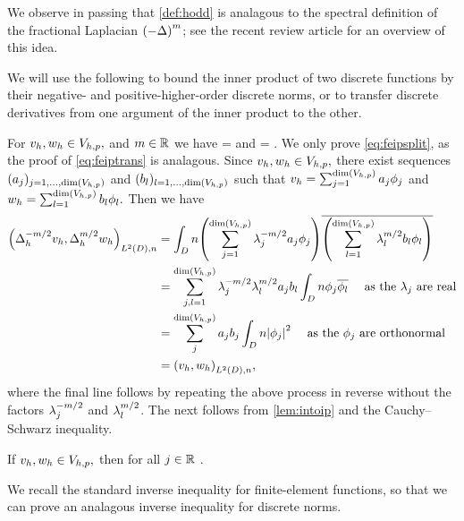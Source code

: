 We observe in passing that \cref{def:hodd} is analagous to the spectral definition of the fractional Laplacian $\mleft(-\Delta\mright)^m$; see the recent review article \cite[Section 2.5.1]{LiPaGuSoGlZhMaCaMeAiKa:18} for an overview of this idea.
\ere

We will use the following  to bound the inner product of two discrete functions by their negative- and positive-higher-order discrete norms, or to transfer discrete derivatives from one argument of the inner product to the other.

\label{lem:intoip}
For $v_{h}, w_{h} \in V_{h,p},$ and $m \in \mathbb R$ we have
\beq\label{eq:feipsplit}
\IPLtDn{\vh}{\wh} = \IPLtDn{\Deltahmmt \vh}{\Deltahmt \wh} 
\eeq
and
\beq\label{eq:feiptrans}
 = \IPLtDn{\Deltahmt \vh}{\Deltahmt \vh}.
\eeq
\ele
{}
We only prove \cref{eq:feipsplit}, as the proof of \cref{eq:feiptrans} is analagous. Since $v_{h},w_{h} \in V_{h,p},$ there exist sequences $(\aj)_{j =1,\ldots,\dimVhp}$ and $(\bsl)_{l =1,\ldots,\dimVhp}$ such that $\vh = \sum_{j=1}^{\dimVhp} \aj\phij$ and $\wh = \sum_{l=1}^{\dimVhp} \bsl \phil.$ Then we have
\begin{align*}
\IPLtDn{\Deltahmmt \vh}{\Deltahmt \wh} &= \int_D n\mleft(\sum_{j=1}^{\dimVhp}\lambdaj^{-m/2} \aj\phij\mright)\overline{\mleft(\sum_{l=1}^{\dimVhp} \lambdal^{m/2}\bsl \phil\mright)}\\
&= \sum_{j,l=1}^{\dimVhp} \lambdaj^{-m/2} \lambdal^{m/2} \aj \bsl \int_D n \phij \philbar\quad \text{ as the } \lambdaj \text{ are real}\\
& =\sum_{j}^{\dimVhp} \aj \bsj \int_D n\abs{\phij}^2\quad \text{ as the } \phij \text{ are orthonormal}\\
&= \IPLtDn{\vh}{\wh},
\end{align*}
where the final line follows by repeating the above process in reverse without the factors $\lambda_{j}^{-m/2}$ and $\lambda_{l}^{m/2}$.
\epf
The next  follows from \cref{lem:intoip} and the Cauchy--Schwarz inequality.

\label{cor:ipdiscbound}
If $v_{h}, w_{h} \in V_{h,p},$ then for all $j \in \mathbb R$
\beqs
\IPLtDn{\vh}{\wh} \leq \Njh{\vh}\Nmjh{\wh}.
\eeqs
\eco

We recall the standard inverse inequality for finite-element functions, so that we can prove an analagous inverse inequality for discrete norms.

